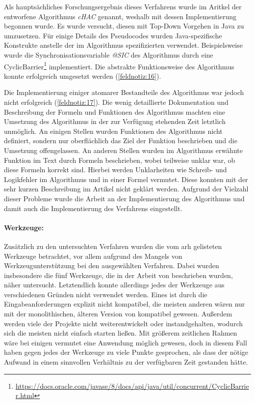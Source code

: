Als hauptsächliches Forschungsergebnis dieses Verfahrens wurde im Aritkel der entworfene Algorithmus \emph{cHAC} genannt, weshalb mit dessen Implementierung begonnen wurde.
Es wurde versucht, diesen mit Top-Down Vorgehen in Java zu umzusetzen.
Für einige Details des Pseudocodes wurden Java-spezifische Konstrukte anstelle der im Algorithmus spezifizierten verwendet.
Beispielsweise wurde die Synchronisationsvariable \emph{@SIC} des Algorithmus durch eine CyclicBarrier\footnote{\url{https://docs.oracle.com/javase/8/docs/api/java/util/concurrent/CyclicBarrier.html}} implementiert.
Die abstrakte Funktionsweise des Algorithmus konnte erfolgreich umgesetzt werden (\cref{feldnotiz:16}).

Die Implementierung einiger atomarer Bestandteile des Algorithmus war jedoch nicht erfolgreich (\cref{feldnotiz:17}).
Die wenig detaillierte Dokumentation und Beschreibung der Formeln und Funktionen des Algorithmus machten eine Umsetzung des Algorithmus in der zur Verfügung stehenden Zeit letztlich unmöglich.
An einigen Stellen wurden Funktionen des Algorithmus nicht definiert, sondern nur oberflächlich das Ziel der Funktion beschrieben und die Umsetzung offengelassen.
An anderen Stellen wurden im Algorithmus erwähnte Funktion im Text durch Formeln beschrieben, wobei teilweise unklar war, ob diese Formeln korrekt sind.
Hierbei werden Unklarheiten wie Schreib- und Logikfehler im Algorithmus und in einer Formel vermutet.
Diese konnten mit der sehr kurzen Beschreibung im Artikel nicht geklärt werden.
Aufgrund der Vielzahl dieser Probleme wurde die Arbeit an der Implementierung des Algorithmus und damit auch die Implementierung des Verfahrens eingestellt. 

\paragraph{Werkzeuge:} Zusätzlich zu den untersuchten Verfahren wurden die vom \gls{arh} gelisteten Werkzeuge betrachtet, vor allem aufgrund des Mangels von Werkzeugunterstützung bei den ausgewählten Verfahren.
Dabei wurden insbesondere die fünf Werkzeuge, die in der Arbeit von  beschrieben wurden, näher untersucht.
Letztendlich konnte allerdings jedes der Werkzeuge aus verschiedenen Gründen nicht verwendet werden.
Eines ist durch die Eingabeanforderungen explizit nicht kompatibel, die meisten anderen wären nur mit der monolithischen, älteren Version von \jf kompatibel gewesen.
Außerdem werden viele der Projekte nicht weiterentwickelt oder instandgehalten, wodurch sich die meisten nicht einfach starten ließen.
Mit größerem zeitlichen Rahmen wäre bei einigen vermutet eine Anwendung möglich gewesen, doch in diesem Fall haben gegen jedes der Werkzeuge zu viele Punkte gesprochen, als dass der nötige Aufwand in einem sinnvollen Verhältnis zu der verfügbaren Zeit gestanden hätte.

